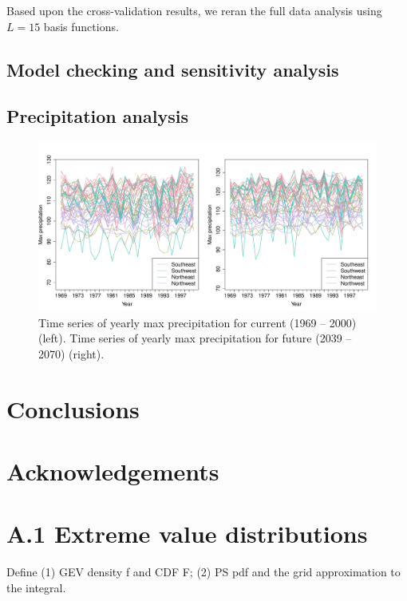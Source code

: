 \documentclass[11pt]{article}
\begin{document}
Based upon the cross-validation results, we reran the full data analysis using $L = 15$ basis functions.



\subsection{Model checking and sensitivity analysis}

\subsection{Precipitation analysis}


\begin{figure}  %
  \centering
  \includegraphics[width=\linewidth]{plots/precip-ts}
  \caption{Time series of yearly max precipitation for current (1969 -- 2000) (left). Time series of yearly max precipitation for future (2039 -- 2070) (right).}
\end{figure}

\section{Conclusions}\label{s:con}

\section*{Acknowledgements}

\section*{A.1 Extreme value distributions}
Define (1) GEV density f and CDF F; (2) PS pdf  and the grid approximation to the integral.

\begin{singlespace}


\end{singlespace}
\end{document}
